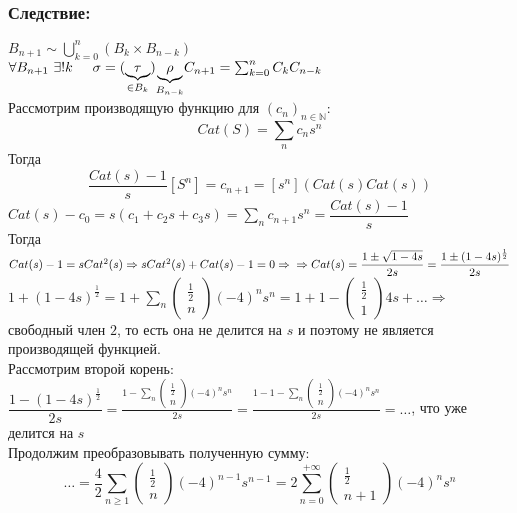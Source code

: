 \documentclass[12pt, letterpaper, twoside]{article}
\newcommand{\DS}{\displaystyle}
\newcommand{\oo}{\infty}
\begin{document}
    \subsubsection*{Следствие:}
    $B_{n + 1} \sim \bigcup\limits_{k = 0}^{n} (B_k \times B_{n - k})$\\
    $\forall B_{n + 1}\ \exists ! k\hspace{0.5cm} \sigma = (\underset{\in B_k}{\underbrace{\tau}})\underset{B_{n - k}}{\underbrace{\rho}}\\
    C_{n + 1} = \sum_{k = 0}^{n} C_k C_{n - k}$\\
    Рассмотрим производящую функцию для $(c_n)_{n\in \mathbb{N}}$:
    \[Cat(S) = \sum_{n} c_n s^n\]
    Тогда
    \[\frac{Cat(s) - 1}{s}[S^n] = c_{n + 1} = [s^n](Cat(s)Cat(s))\]
    $Cat(s) - c_0 = s(c_1 + c_2 s + c_3 s) = \sum_{n}{c_{n + 1} s^n} = \dfrac{Cat(s) -  1}{s}$\\
    Тогда $Cat(s) - 1 = sCat^2(s)\Rightarrow sCat^2(s) + Cat(s) - 1 = 0\Rightarrow\\
    \Rightarrow Cat(s) = \dfrac{1 \pm \sqrt{1 - 4s}}{2s} = \dfrac{1 \pm (1 - 4s)^{\frac{1}{2}}}{2s}$\\
    $1 + (1 - 4s)^{\frac{1}{2}} = 1 + \DS\sum_{n} \begin{pmatrix}
        \frac{1}{2}\\
        n
    \end{pmatrix} (-4)^n s^n = 1 + 1 - \begin{pmatrix}
        \frac{1}{2}\\
        1
    \end{pmatrix} 4 s + \dots\Rightarrow$ свободный член $2$, то есть она не делится на $s$ и поэтому не является производящей функцией.\\
    Рассмотрим второй корень:\\
    $\DS\dfrac{1 - (1 - 4s)^{\frac{1}{2}}}{2s} = \frac{1 - \sum_{n} \begin{pmatrix}\frac{1}{2} \\ n\end{pmatrix} (-4)^n s^n }{2s} = \frac{1 - 1 - \sum_{n} \begin{pmatrix}\frac{1}{2} \\ n\end{pmatrix} (-4)^n s^n }{2s} = \dots$, что уже делится на $s$\\
    Продолжим преобразовывать полученную сумму:
    \[\dots= \frac{4}{2} \DS\sum_{n \geq 1} \begin{pmatrix}
        \frac{1}{2} \\ n
    \end{pmatrix} (-4)^{n - 1} s^{n - 1} = 2\sum_{n = 0}^{+\oo} \begin{pmatrix}
        \frac{1}{2} \\ n + 1
    \end{pmatrix} (-4)^{n} s^n\]
\end{document}

